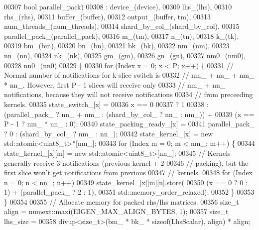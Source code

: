 \begin{DoxyCode}
00307             \textcolor{keywordtype}{bool} parallel\_pack)
00308         : device\_(device),
00309           lhs\_(lhs),
00310           rhs\_(rhs),
00311           buffer\_(buffer),
00312           output\_(buffer, tm),
00313           num\_threads\_(num\_threads),
00314           shard\_by\_col\_(shard\_by\_col),
00315           parallel\_pack\_(parallel\_pack),
00316           m\_(tm),
00317           n\_(tn),
00318           k\_(tk),
00319           bm\_(bm),
00320           bn\_(bn),
00321           bk\_(bk),
00322           nm\_(nm),
00323           nn\_(nn),
00324           nk\_(nk),
00325           gm\_(gm),
00326           gn\_(gn),
00327           nm0\_(nm0),
00328           nn0\_(nn0)
00329   \{
00330       \textcolor{keywordflow}{for} (Index x = 0; x < P; x++) \{
00331         \textcolor{comment}{// Normal number of notifications for k slice switch is}
00332         \textcolor{comment}{// nm\_ + nn\_ + nm\_ * nn\_. However, first P - 1 slices will receive only}
00333         \textcolor{comment}{// nm\_ + nn\_ notifications, because they will not receive notifications}
00334         \textcolor{comment}{// from preceeding kernels.}
00335         state\_switch\_[x] =
00336             x == 0
00337                 ? 1
00338                 : (parallel\_pack\_ ? nn\_ + nm\_ : (shard\_by\_col\_ ? nn\_ : nm\_)) +
00339                       (x == P - 1 ? nm\_ * nn\_ : 0);
00340         state\_packing\_ready\_[x] =
00341             parallel\_pack\_ ? 0 : (shard\_by\_col\_ ? nm\_ : nn\_);
00342         state\_kernel\_[x] = \textcolor{keyword}{new} std::atomic<uint8\_t>*[nm\_];
00343         \textcolor{keywordflow}{for} (Index m = 0; m < nm\_; m++) \{
00344           state\_kernel\_[x][m] = \textcolor{keyword}{new} std::atomic<uint8\_t>[nn\_];
00345           \textcolor{comment}{// Kernels generally receive 3 notifications (previous kernel + 2}
00346           \textcolor{comment}{// packing), but the first slice won't get notifications from previous}
00347           \textcolor{comment}{// kernels.}
00348           \textcolor{keywordflow}{for} (Index n = 0; n < nn\_; n++)
00349             state\_kernel\_[x][m][n].store(
00350                 (x == 0 ? 0 : 1) + (parallel\_pack\_ ? 2 : 1),
00351                 std::memory\_order\_relaxed);
00352         \}
00353       \}
00354 
00355       \textcolor{comment}{// Allocate memory for packed rhs/lhs matrices.}
00356       \textcolor{keywordtype}{size\_t} align = numext::maxi(EIGEN\_MAX\_ALIGN\_BYTES, 1);
00357       \textcolor{keywordtype}{size\_t} lhs\_size =
00358           divup<size\_t>(bm\_ * bk\_ * \textcolor{keyword}{sizeof}(LhsScalar), align) * align;

\end{DoxyCode}
